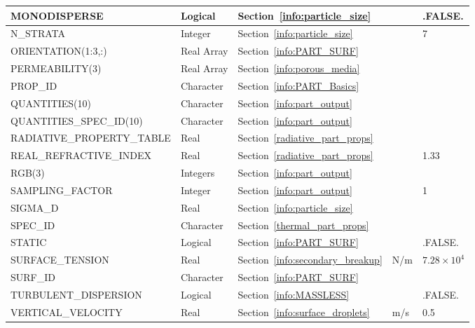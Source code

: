 \documentclass[11pt]{book}
\begin{document}
\begin{longtable}{@{\extracolsep{\fill}}|l|l|l|l|l|}
{\ct MONODISPERSE}                  & Logical         & Section~\ref{info:particle_size}        &           & {\ct .FALSE.} \\ \hline
{\ct N\_STRATA}                     & Integer         & Section~\ref{info:particle_size}        &           & 7             \\ \hline
{\ct ORIENTATION(1:3,:)}            & Real Array      & Section~\ref{info:PART_SURF}            &           &               \\ \hline
{\ct PERMEABILITY(3)}               & Real Array      & Section~\ref{info:porous_media}        &           &               \\ \hline
{\ct PROP\_ID}                      & Character       & Section~\ref{info:PART_Basics}          &           &               \\ \hline
{\ct QUANTITIES(10)}                & Character       & Section~\ref{info:part_output}          &           &               \\ \hline
{\ct QUANTITIES\_SPEC\_ID(10)}      & Character       & Section~\ref{info:part_output}          &           &               \\ \hline
{\ct RADIATIVE\_PROPERTY\_TABLE}    & Real            & Section~\ref{radiative_part_props}      &           &               \\ \hline
{\ct REAL\_REFRACTIVE\_INDEX}       & Real            & Section~\ref{radiative_part_props}      &           & 1.33          \\ \hline
{\ct RGB(3)}                        & Integers        & Section~\ref{info:part_output}          &           &               \\ \hline
{\ct SAMPLING\_FACTOR}              & Integer         & Section~\ref{info:part_output}          &           & 1             \\ \hline
{\ct SIGMA\_D}                      & Real            & Section~\ref{info:particle_size}        &           &               \\ \hline
{\ct SPEC\_ID}                      & Character       & Section~\ref{thermal_part_props}        &           &               \\ \hline
{\ct STATIC}                        & Logical         & Section~\ref{info:PART_SURF}            &           & {\ct .FALSE.} \\ \hline
{\ct SURFACE\_TENSION}              & Real            & Section~\ref{info:secondary_breakup}    & N/m       & $7.28 \times 10^4$  \\ \hline
{\ct SURF\_ID}                      & Character       & Section~\ref{info:PART_SURF}            &           &               \\ \hline
{\ct TURBULENT\_DISPERSION}         & Logical         & Section~\ref{info:MASSLESS}             &           & {\ct .FALSE.} \\ \hline
{\ct VERTICAL\_VELOCITY}            & Real            & Section~\ref{info:surface_droplets}     & m/s       &  0.5          \\ \hline
\end{longtable}
\end{document}
